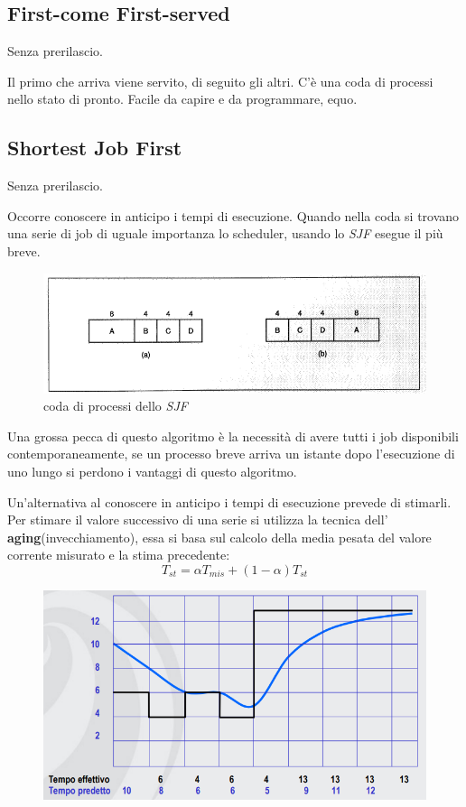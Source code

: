 \subsection{First-come First-served}
Senza prerilascio. 

Il primo che arriva viene servito, di seguito gli altri. C'è una coda di processi nello stato di pronto.
Facile da capire e da programmare, equo.

\subsection{Shortest Job First}
Senza prerilascio.

Occorre conoscere in anticipo i tempi di esecuzione.
Quando nella coda si trovano una serie di job di uguale importanza lo scheduler, usando lo \textit{SJF} esegue il più breve.

\begin{figure}[H]
    \centering
    \includegraphics[width=0.6\linewidth]{assets/sjf4.png}
    \caption{coda di processi dello \textit{SJF}}
\end{figure}

Una grossa pecca di questo algoritmo è la necessità di avere tutti i job disponibili contemporaneamente, se un processo breve arriva un istante dopo l'esecuzione di uno lungo si perdono i vantaggi di questo algoritmo.

Un'alternativa al conoscere in anticipo i tempi di esecuzione prevede di stimarli. Per stimare il valore successivo di una serie si utilizza la tecnica dell' \textbf{aging}(invecchiamento), essa si basa sul calcolo della media pesata del valore corrente misurato e la stima precedente: 
\begin{equation}
    T_{st} = \alpha T_{mis} + (1 - \alpha )T_{st}
\end{equation}

\begin{figure}[H]
    \centering
    \includegraphics[width=0.6\linewidth]{assets/predizione4.png}
\end{figure}

